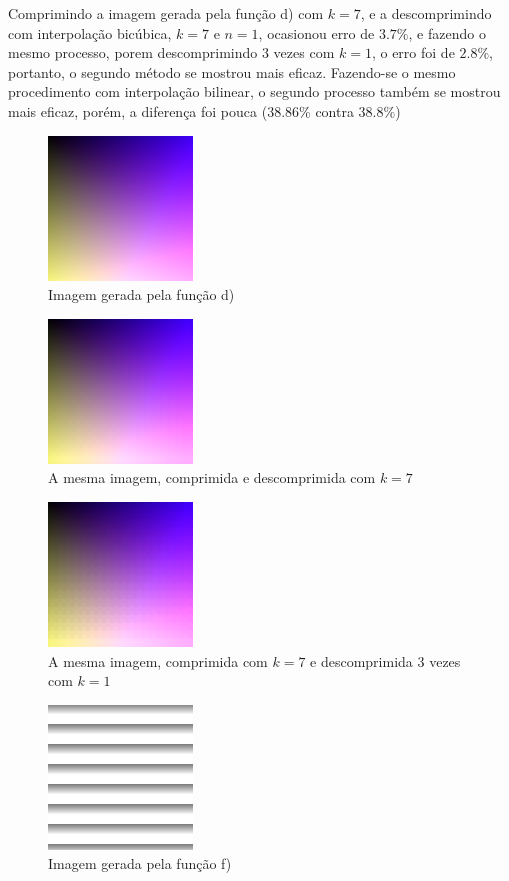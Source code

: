 \documentclass{article}
\begin{document}
Comprimindo a imagem gerada pela função d) com $k = 7$, e a descomprimindo com interpolação bicúbica, $k = 7$ e $n = 1$, ocasionou erro de $3.7\%$, e fazendo o mesmo processo, porem descomprimindo 3 vezes com $k = 1$, o erro foi de $2.8\%$, portanto, o segundo método se mostrou mais eficaz. Fazendo-se o mesmo procedimento com interpolação bilinear, o segundo processo também se mostrou mais eficaz, porém, a diferença foi pouca ($38.86\%$ contra $38.8\%$)

\begin{figure}[!hbt]
	\centering
	\includegraphics[width=0.2\linewidth]{zoologico/color4}
	\caption{Imagem gerada pela função d)}
\end{figure}

\begin{figure}[!hbt]
	\centering
	\includegraphics[width=0.2\linewidth]{zoologico/7}
	\caption{A mesma imagem, comprimida e descomprimida com $k = 7$}
\end{figure}

\begin{figure}[!hbt]
	\centering
	\includegraphics[width=0.2\linewidth]{zoologico/1 1 1}
	\caption{A mesma imagem, comprimida com $k=7$ e descomprimida 3 vezes com $k = 1$}
\end{figure}

\begin{figure}[!hbt]
	\centering
	\includegraphics[width=0.2\linewidth]{zoologico/pb2}
	\caption{Imagem gerada pela função f)}
\end{figure}
\end{document}
